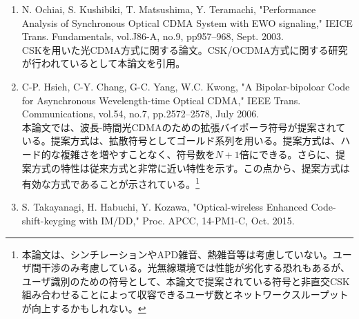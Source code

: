 ﻿\documentclass[a4j,10pt]{jarticle}
\begin{document}
\begin{enumerate}
本稿では、擬直交M系列対を用いた光無線DS/SS方式について検討を行っている。情報変調方式としてユーザに2つの拡散符号系列を割り当てるコードシフトキーイング形式型DS/SS方式と、1つの拡散符号系列を使用するオンオフキーイング型DS/SS方式を取り上げている。本稿では、この2つの情報変調方式を適用した場合について、シンチレーション、背景光、APD雑音、熱雑音、多元接続干渉を考慮したビット誤り率を導出している。さらに、擬直交M系列対を使用したコードシフトキーイング型DS/SS方式と従来方式である拡張プライム符号系列を使用したDS/SS方式を比較している。その結果、本方式は拡張プライム符号系列を用いるよりも収容ユーザ数を多くすることができることが示されている。また、本方式のビット誤り率性能は拡張プライム符号系列を用いた場合よりも良好であることが示されている。\footnote{茨城大学小澤先生（出身研究室の後輩）の論文。非直交CSKを用いたIM/DD方式のシンボル誤り率の解析式を求める上でかなり参考にした論文。今の所、非直交CSKでは、変形擬直交M系列は用いていないが、\bf{マルチユーザ環境での性能向上を図るためには変形擬直交M系列のように、収容できるユーザ数を向上するための符号構成法について検討する必要}がある。}
%
\item N. Ochiai, S. Kushibiki, T. Matsushima, Y. Teramachi, 
"Performance Analysis of Synchronous Optical CDMA System with EWO signaling," 
IEICE Trans. Fundamentals, vol.J86-A, no.9, pp957--968, Sept. 2003. \\
CSKを用いた光CDMA方式に関する論文。CSK/OCDMA方式に関する研究が行われているとして本論文を引用。
%
%
\item C-P. Hsieh, C-Y. Chang, G-C. Yang, W.C. Kwong, 
"A Bipolar-bipoloar Code for Asynchronous Wevelength-time Optical CDMA," 
IEEE Trans. Communications, vol.54, no.7, pp.2572--2578, July 2006. \\
本論文では、波長-時間光CDMAのための拡張バイポーラ符号が提案されている。提案方式は、拡散符号としてゴールド系列を用いる。提案方式は、ハード的な複雑さを増やすことなく、符号数を$N+1$倍にできる。さらに、提案方式の特性は従来方式と非常に近い特性を示す。この点から、提案方式は有効な方式であることが示されている。\footnote{本論文は、シンチレーションやAPD雑音、熱雑音等は考慮していない。ユーザ間干渉のみ考慮している。光無線環境では性能が劣化する恐れもあるが、ユーザ識別のための符号として、本論文で提案されている符号と非直交CSK組み合わせることによって収容できるユーザ数とネットワークスループットが向上するかもしれない。}
%
\item S. Takayanagi, H. Habuchi, Y. Kozawa, 
"Optical-wireless Enhanced Code-shift-keyging with IM/DD," 
Proc. APCC, 14-PM1-C, Oct. 2015.\\

\end{enumerate}
\end{document}
